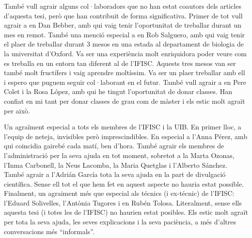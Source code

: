 També vull agrair alguns col·laboradors que no han estat coautors dels articles
d'aquesta tesi, però que han contribuit de forma significativa. Primer de tot
vull agrair a en Dan Bebber, amb qui vaig tenir l'oportunitat de treballar
durant un mes en remot. També una menció especial a en Rob Salguero, amb qui
vaig tenir el plaer de treballar durant 3 mesos en una estada al departament de
biologia de la universitat d'Oxford. Va ser una experiència molt enriquidora
poder veure com es treballa en un entorn tan diferent al de l'IFISC. Aquests
tres mesos van ser també molt fructífers i vaig aprendre moltíssim. Va ser un
plaer treballar amb ell i espero que puguem seguir col·laborant en el futur.
També vull agrair a en Pere Colet i la Rosa López, amb qui he tingut
l'oportunitat de donar classes. Han confiat en mi tant per donar classes de
grau com de màster i els estic molt agraït per això.

Un agraïment especial a tots els membres de l'IFISC i la UIB. En primer lloc,
a l'equip de neteja, invisibles però imprescindibles. En especial a l'Anna
Pérez, amb qui coincidia gairebé cada matí, ben d'hora. També agrair els
membres de l'administració per la seva ajuda en tot moment, sobretot a la Marta
Ozonas, l'Inma Carbonell, la Neus Lacomba, la Maria Quetglas i l'Alberto
Sánchez. També agrair a l'Adrián García tota la seva ajuda en la part de
divulgació científica. Sense ell tot el que hem fet en aquest aspecte no hauria
estat possible. Finalment, un agraiment més que especial als técnics (i
ex-técnic) de l'IFISC: l'Eduard Solivelles, l'Antònia Tugores i en Rubén
Tolosa. Literalment, sense ells aquesta tesi (i totes les de l'IFISC) no
haurien estat posibles. Els estic molt agraït per tota la seva ajuda, les seves
explicacions i la seva paciència, a més d'altres conversacions més
``informals''.

